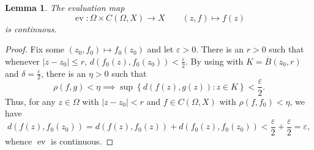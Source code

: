 \documentclass[11pt]{article}
\theoremstyle{thmstyle}
\newtheorem{lemma}[theorem]{Lemma}
\theoremstyle{defstyle}
\newcommand{\ev}{\operatorname{ev}}
\renewcommand{\le}{\leqslant}
\begin{document}
\begin{lemma}
    The evaluation map 
    \begin{equation*}
        \ev\colon\Omega\times C(\Omega, X)\to X\qquad (z, f)\mapsto f(z)
    \end{equation*}
    is continuous.
\end{lemma}
\begin{proof}
    Fix some $(z_0, f_0)\mapsto f_0(z_0)$ and let $\varepsilon > 0$. There is an $r > 0$ such that whenever $|z - z_0|\le r$, $d(f_0(z), f_0(z_0)) < \frac{\varepsilon}{2}$. By using  with $K = \overline B(z_0, r)$ and $\delta = \frac{\varepsilon}{2}$, there is an $\eta > 0$ such that
    \begin{equation*}
        \rho(f, g) < \eta \implies \sup\left\{d(f(z), g(z))\colon z\in K\right\} < \frac{\varepsilon}{2}.
    \end{equation*}
    Thus, for any $z\in\Omega$ with $|z - z_0| < r$ and $f\in C(\Omega, X)$ with $\rho(f, f_0) < \eta$, we have 
    \begin{equation*}
        d(f(z), f_0(z_0)) = d(f(z), f_0(z)) + d(f_0(z), f_0(z_0)) < \frac{\varepsilon}{2} + \frac{\varepsilon}{2} = \varepsilon,
    \end{equation*}
    whence $\ev$ is continuous.
\end{proof}
\end{document}
